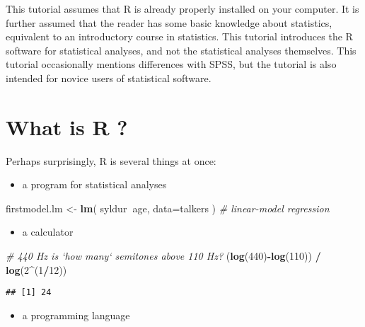 \documentclass[]{book}
\newenvironment{Shaded}{\begin{snugshade}}{\end{snugshade}}
\newcommand{\CommentTok}[1]{\textcolor[rgb]{0.56,0.35,0.01}{\textit{#1}}}
\newcommand{\DataTypeTok}[1]{\textcolor[rgb]{0.13,0.29,0.53}{#1}}
\newcommand{\DecValTok}[1]{\textcolor[rgb]{0.00,0.00,0.81}{#1}}
\newcommand{\KeywordTok}[1]{\textcolor[rgb]{0.13,0.29,0.53}{\textbf{#1}}}
\newcommand{\NormalTok}[1]{#1}
\newcommand{\OperatorTok}[1]{\textcolor[rgb]{0.81,0.36,0.00}{\textbf{#1}}}
\newcommand{\StringTok}[1]{\textcolor[rgb]{0.31,0.60,0.02}{#1}}
\providecommand{\tightlist}{%
  \setlength{\itemsep}{0pt}\setlength{\parskip}{0pt}}
\begin{document}
This tutorial assumes that R is already properly
installed on your computer. It is further assumed that the reader has
some basic knowledge about statistics, equivalent to an introductory
course in statistics. This tutorial introduces the R
software for statistical analyses, and not the statistical analyses
themselves. This tutorial occasionally mentions differences with SPSS,
but the tutorial is also intended for novice users of statistical
software.

\hypertarget{sec:whatisR}{%
\section{What is R ?}\label{sec:whatisR}}

Perhaps surprisingly, R is several things at once:

\begin{itemize}
\tightlist
\item
  a program for statistical analyses
\end{itemize}

\begin{Shaded}
\begin{Highlighting}[]
\NormalTok{firstmodel.lm <-}\StringTok{ }\KeywordTok{lm}\NormalTok{( syldur}\OperatorTok{~}\NormalTok{age, }\DataTypeTok{data=}\NormalTok{talkers ) }\CommentTok{# linear-model regression}
\end{Highlighting}
\end{Shaded}

\begin{itemize}
\tightlist
\item
  a calculator
\end{itemize}

\begin{Shaded}
\begin{Highlighting}[]
\CommentTok{# 440 Hz is `how many` semitones above 110 Hz?}
\NormalTok{(}\KeywordTok{log}\NormalTok{(}\DecValTok{440}\NormalTok{)}\OperatorTok{-}\KeywordTok{log}\NormalTok{(}\DecValTok{110}\NormalTok{)) }\OperatorTok{/}\StringTok{ }\KeywordTok{log}\NormalTok{(}\DecValTok{2}\OperatorTok{^}\NormalTok{(}\DecValTok{1}\OperatorTok{/}\DecValTok{12}\NormalTok{)) }
\end{Highlighting}
\end{Shaded}

\begin{verbatim}
## [1] 24
\end{verbatim}

\begin{itemize}
\tightlist
\item
  a programming language
\end{itemize}
\end{document}
